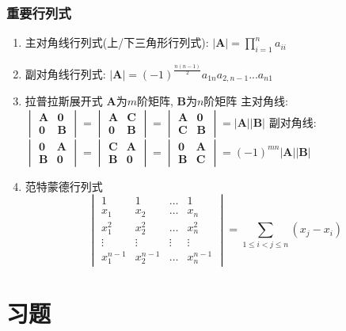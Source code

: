 \subsubsection{重要行列式}
\begin{enumerate}
\item 主对角线行列式(上/下三角形行列式): $ |\bm{A}|=\prod_{i=1}^{n}a_{ii} $
\item 副对角线行列式: $ |\bm{A}|=(-1)^{\frac{n(n-1)}{2}}a_{1n}a_{2,n-1}...a_{n1} $
\item 拉普拉斯展开式
\subitem $ \bm{A} $为$ m $阶矩阵, $ \bm{B} $为$ n $阶矩阵
\subitem 主对角线:
$ \begin{vmatrix}
\bm{A} & \bm{0} \\
\bm{0} & \bm{B}
\end{vmatrix} = \begin{vmatrix}
\bm{A} & \bm{C} \\
\bm{0} & \bm{B}
\end{vmatrix} = \begin{vmatrix}
\bm{A} & \bm{0} \\
\bm{C} & \bm{B}
\end{vmatrix} = |\bm{A}||\bm{B}|$
\subitem 副对角线: 
$ \begin{vmatrix}
\bm{0} & \bm{A} \\
\bm{B} & \bm{0}
\end{vmatrix} = \begin{vmatrix}
\bm{C} & \bm{A} \\
\bm{B} & \bm{0}
\end{vmatrix} = \begin{vmatrix}
\bm{0} & \bm{A} \\
\bm{B} & \bm{C}
\end{vmatrix} = (-1)^{mn}|\bm{A}||\bm{B}|$
\item 范特蒙德行列式
\begin{equation*}
\begin{vmatrix}
1 & 1 & \dots & 1 \\
x_1 & x_2 & \dots & x_n \\
x_1^2 & x_2^2 & \dots & x_n^2 \\
\vdots & \vdots  & \vdots & \vdots \\
x_{1}^{n-1} & x_{2}^{n-1} & \dots & x_{n}^{n-1} 
\end{vmatrix} = \sum_{1\le i<j\le n}(x_{j}-x_{i})
\end{equation*}
\end{enumerate} 
\section{习题}
